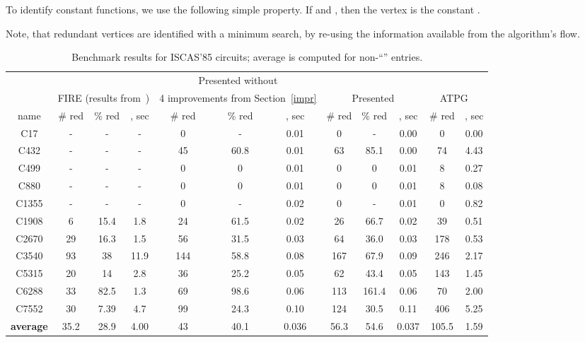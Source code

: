 \documentclass[conference]{IEEEtran} \usepackage{times}
\begin{document}
To identify constant functions, we use the following simple property.
If  and , then the vertex  is the constant .

Note, that redundant vertices are identified with a minimum search, by
re-using the information available from the algorithm's flow. 

\begin{table*}[t!]\centering\footnotesize
\begin{tabular}{|c||c|c|c||c|c|c||c|c|c||c|c|} \hline
& \multicolumn{3}{c||}{} & \multicolumn{3}{c||}{Presented without} & \multicolumn{3}{c||}{} & \multicolumn{2}{c|}{} \\ 
& \multicolumn{3}{c||}{FIRE (results from~\cite{IyA96})} & \multicolumn{3}{c||}{4 improvements from Section~\ref{impr}} & \multicolumn{3}{c||}{Presented} 
& \multicolumn{2}{c|}{ATPG~\cite{BrD94}} \\ \cline{2-12}

name  & \# red & \% red & , sec & \# red & \% red & , sec & \# red & \% red & , sec  & \# red 
& , sec \\ \hline

C17   & -  & -    & -    & 0   & -    & 0.01 & 0   & -    & 0.00 & 0   & 0.00 \\ \hline
C432  & -  & -    & -    & 45  & 60.8 & 0.01 & 63  & 85.1 & 0.00 & 74  & 4.43 \\ \hline
C499  & -  & -    & -    & 0   & 0    & 0.01 & 0   & 0    & 0.01 & 8   & 0.27 \\ \hline
C880  & -  & -    & -    & 0   & 0    & 0.01 & 0   & 0    & 0.01 & 8   & 0.08 \\ \hline
C1355 & -  & -    & -    & 0   & -    & 0.02 & 0   & -    & 0.01 & 0   & 0.82 \\ \hline
C1908 & 6  & 15.4 & 1.8  & 24  & 61.5 & 0.02 & 26  & 66.7 & 0.02 & 39  & 0.51 \\ \hline
C2670 & 29 & 16.3 & 1.5  & 56  & 31.5 & 0.03 & 64  & 36.0 & 0.03 & 178 & 0.53 \\ \hline
C3540 & 93 & 38   & 11.9 & 144 & 58.8 & 0.08 & 167 & 67.9 & 0.09 & 246 & 2.17 \\ \hline
C5315 & 20 & 14   & 2.8  & 36  & 25.2 & 0.05 & 62  & 43.4 & 0.05 & 143 & 1.45 \\ \hline
C6288 & 33 & 82.5 & 1.3  & 69  & 98.6 & 0.06 & 113 & 161.4 & 0.06 & 70 & 2.00 \\ \hline
C7552 & 30 & 7.39 & 4.7  & 99  & 24.3 & 0.10 & 124 & 30.5 & 0.11 & 406 & 5.25 \\ \hline \hline
{\bf average } & 35.2 & 28.9 & 4.00 & 43 & 40.1 & 0.036 & 56.3 & 54.6 & 0.037 & 105.5 & 1.59 \\ \hline
\end{tabular}
\caption{Benchmark results for ISCAS'85 circuits; average is computed 
for non-``'' entries.} \label{t1}
\end{table*}
\end{document}
